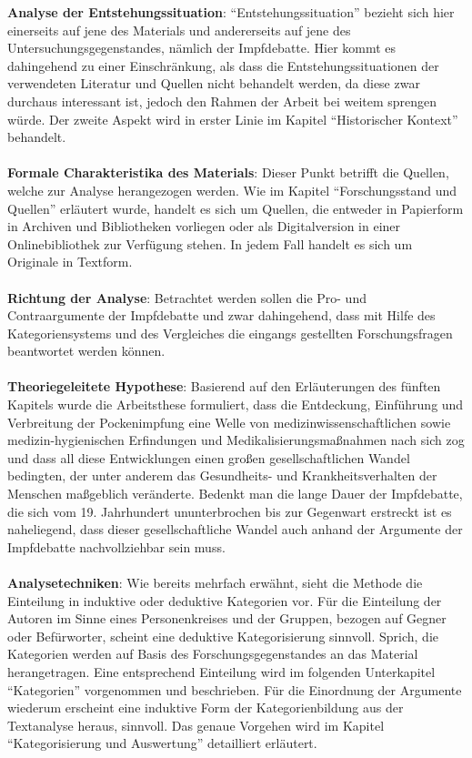 \documentclass[
    a4paper,
    12pt,
    hyphens,
    chapterprefix=true,
    headheight=33pt,
    footheight=29pt,
    headings=optiontohead,
]{scrartcl}
\begin{document}
\textbf{Analyse der Entstehungssituation}: "`Entstehungssituation"' bezieht sich hier einerseits auf jene des Materials und andererseits auf jene des Untersuchungsgegenstandes, nämlich der Impfdebatte.  Hier kommt es dahingehend zu einer Einschränkung, als dass die Entstehungssituationen der verwendeten Literatur und Quellen nicht behandelt werden, da diese zwar durchaus interessant ist, jedoch den Rahmen der Arbeit bei weitem sprengen würde. Der zweite Aspekt wird in erster Linie im Kapitel "`Historischer Kontext"' behandelt.\\
\\
\textbf{Formale Charakteristika des Materials}: Dieser Punkt betrifft die Quellen, welche zur Analyse herangezogen werden. Wie im Kapitel "`Forschungsstand und Quellen"' erläutert wurde, handelt es sich um Quellen, die entweder in Papierform in Archiven und Bibliotheken vorliegen oder als Digitalversion in einer Onlinebibliothek zur Verfügung stehen. In jedem Fall handelt es sich um Originale in Textform.\\
\\
\textbf{Richtung der Analyse}: Betrachtet werden sollen die Pro- und Contraargumente der Impfdebatte und zwar dahingehend, dass mit Hilfe des Kategoriensystems und des Vergleiches die eingangs gestellten Forschungsfragen beantwortet werden können.\\
\\
\textbf{Theoriegeleitete Hypothese}: Basierend auf den Erläuterungen des fünften Kapitels wurde die Arbeitsthese formuliert, dass die Entdeckung, Einführung und Verbreitung der Pockenimpfung eine Welle von medizinwissenschaftlichen sowie medizin-hygienischen Erfindungen und Medikalisierungsmaßnahmen nach sich zog und dass all diese Entwicklungen einen großen gesellschaftlichen Wandel bedingten, der unter anderem das Gesundheits- und Krankheitsverhalten der Menschen maßgeblich veränderte. Bedenkt man die lange Dauer der Impfdebatte, die sich vom 19. Jahrhundert ununterbrochen bis zur Gegenwart erstreckt ist es naheliegend, dass dieser gesellschaftliche Wandel auch anhand der Argumente der Impfdebatte nachvollziehbar sein muss.\\
\\
\textbf{Analysetechniken}: Wie bereits mehrfach erwähnt, sieht die Methode die Einteilung in induktive oder deduktive Kategorien vor. Für die Einteilung der Autoren im Sinne eines Personenkreises und der Gruppen, bezogen auf Gegner oder Befürworter, scheint eine deduktive Kategorisierung sinnvoll. Sprich, die Kategorien werden auf Basis des Forschungsgegenstandes an das Material herangetragen. Eine entsprechend Einteilung wird im folgenden Unterkapitel "`Kategorien"' vorgenommen und beschrieben. Für die Einordnung der Argumente wiederum erscheint eine induktive Form der Kategorienbildung aus der Textanalyse heraus, sinnvoll. Das genaue Vorgehen wird im Kapitel "`Kategorisierung und Auswertung"' detailliert erläutert. \\
\end{document}
